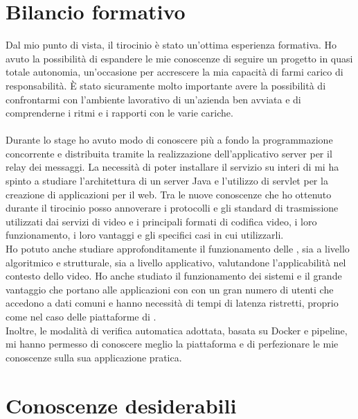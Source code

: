 \section{Bilancio formativo}
Dal mio punto di vista, il tirocinio è stato un'ottima esperienza formativa. Ho avuto la possibilità di espandere le mie conoscenze di seguire un progetto in quasi totale autonomia, un'occasione per accrescere la mia capacità di farmi carico di responsabilità. È stato sicuramente molto importante avere la possibilità di confrontarmi con l'ambiente lavorativo di un'azienda ben avviata e di comprenderne i ritmi e i rapporti con le varie cariche.
\paragraph*{}
Durante lo stage ho avuto modo di conoscere più a fondo la programmazione concorrente e distribuita tramite la realizzazione dell'applicativo server per il relay dei messaggi. La necessità di poter installare il servizio su interi  di  mi ha spinto a studiare l'architettura di un server Java e l'utilizzo di servlet per la creazione di applicazioni per il web. Tra le nuove conoscenze che ho ottenuto durante il tirocinio posso annoverare i protocolli e gli standard di trasmissione utilizzati dai servizi di  video e i principali formati di codifica video, i loro funzionamento, i loro vantaggi e gli specifici casi in cui utilizzarli.
\\
Ho potuto anche studiare approfonditamente il funzionamento delle , sia a livello algoritmico e strutturale, sia a livello applicativo, valutandone l'applicabilità nel contesto dello  video. Ho anche studiato il funzionamento dei sistemi  e il grande vantaggio che portano alle applicazioni con con un gran numero di utenti che accedono a dati comuni e hanno necessità di tempi di latenza ristretti, proprio come nel caso delle piattaforme di . 
\\
Inoltre, le modalità di verifica automatica adottata, basata su Docker e pipeline, mi hanno permesso di conoscere meglio la piattaforma e di perfezionare le mie conoscenze sulla sua applicazione pratica.

\section{Conoscenze desiderabili}

